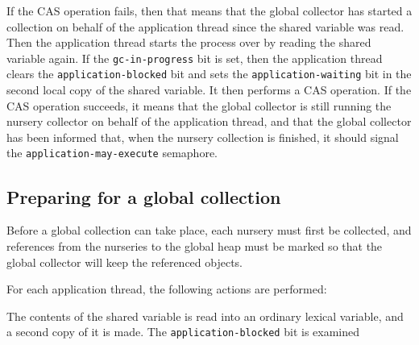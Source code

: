 If the CAS operation fails, then that means that the global collector
has started a collection on behalf of the application thread since the
shared variable was read.  Then the application thread starts the
process over by reading the shared variable again.  If the
\texttt{gc-in-progress} bit is set, then the application thread clears
the \texttt{application-blocked} bit and sets the
\texttt{application-waiting} bit in the second local copy of the
shared variable.  It then performs a CAS operation.  If the CAS
operation succeeds, it means that the global collector is still
running the nursery collector on behalf of the application thread, and
that the global collector has been informed that, when the nursery
collection is finished, it should signal the
\texttt{application-may-execute} semaphore.

\subsection{Preparing for a global collection}

Before a global collection can take place, each nursery must first be
collected, and references from the nurseries to the global heap must
be marked so that the global collector will keep the referenced
objects.

For each application thread, the following actions are performed:

The contents of the shared variable is read into an ordinary lexical
variable, and a second copy of it is made.  The
\texttt{application-blocked} bit is examined

